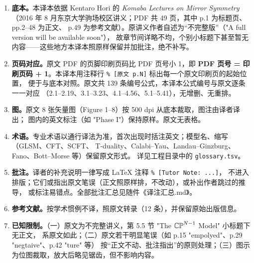 \begin{enumerate}[leftmargin=2em,itemsep=4pt]
\item \textbf{底本。}本译本依据 Kentaro Hori 的 \textit{Komaba Lectures on Mirror Symmetry}
  （2016 年 8 月东京大学驹场校区讲义；PDF 共 49 页，其中 p.1 为标题页、pp.2--48 为正文、
  p.49 为参考文献）。原讲义作者自述为“不完整版”（"A full version will be available soon"），
  故章节间详略不均，个别小标题下甚至暂无内容——这些地方本译本照原样保留并加批注，绝不补写。

\item \textbf{页码对应。}原文 PDF 的页脚印刷页码比 PDF 页号小 1，即
  \textbf{PDF 页号 = 印刷页码 + 1}。本译本用注释行 \verb|% [原文 p.N]| 标出每一个原文印刷页的起始位置，
  便于与底本对照。原文共 139 条编号公式，本译本公式编号与原文逐条一一对应
  （2.1--2.19、3.1--3.23、4.1--4.56、5.1--5.41），无增删、无重排。

\item \textbf{图。}原文 8 张矢量图（Figure 1--8）按 500 dpi 从底本裁取，图注由译者译出；
  图内的英文标注（如 "Phase I"）保持原样。原文无表格。

\item \textbf{术语。}专业术语以通行译法为准，首次出现时括注英文；模型名、缩写（GLSM、CFT、SCFT、
  T-duality、Calabi--Yau、Landau--Ginzburg、Fano、Bott--Morse 等）保留原文形式。
  详见工程目录中的 \verb|glossary.tsv|。

\item \textbf{批注。}译者的补充说明一律写成 LaTeX 注释 \verb|% [Tutor Note: ...]|，
  不进入排版；它们或指出原文笔误（正文照原样排，不改动），或补出作者跳过的推导，
  或标注易错点。全部批注汇总见随件《译注汇总.md》。

\item \textbf{参考文献。}按学术惯例不译，照原文转录（12 条），并保留原始出版信息。

\item \textbf{已知限制。}（一）原文为不完整讲义，第 5.5 节 "The $\mathbb{CP}^{N-1}$ Model" 小标题下无正文，
  系原文如此；（二）原文若干明显笔误（如 p.15 "empolyed"、p.29 "negtaive"、p.42 "ture" 等）
  按“正文不动、批注指出”的原则处理；（三）图示为位图裁取，放大后略见锯齿，但不影响内容。
\end{enumerate}

\clearpage
